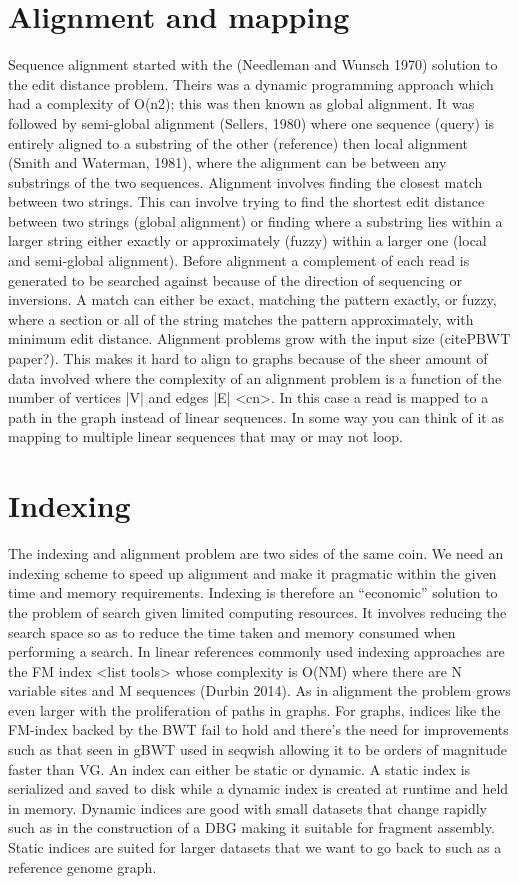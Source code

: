 \documentclass[11pt]{article}
\begin{document}
\section{Alignment and mapping}
\label{sec:org6ca859e}
Sequence alignment started with the (Needleman and Wunsch 1970) solution to the edit distance problem. Theirs was a dynamic programming approach which had a complexity of O(n2); this was then known as global alignment. It was followed by semi-global alignment (Sellers, 1980) where one sequence (query) is entirely aligned to a substring of the other (reference) then local alignment (Smith and Waterman, 1981), where the alignment can be between any substrings of the two sequences.
Alignment involves finding the closest match between two strings. This can involve trying to find the shortest edit distance between two strings (global alignment) or finding where a substring lies within a larger string either exactly or approximately (fuzzy) within a larger one (local and semi-global alignment).
Before alignment a complement of each read is generated to be searched against because of the direction of sequencing or inversions. A match can either be exact, matching the pattern exactly, or fuzzy, where a section or all of the string matches the pattern approximately, with minimum edit distance.
Alignment problems grow with the input size (citePBWT paper?). This makes it hard to align to graphs because of the sheer amount of data involved where the complexity of an alignment problem is a function of the number of  vertices |V| and edges |E| <cn>.  In this case a read is mapped to a  path in the graph instead of linear sequences. In some way you can think of it as mapping to multiple linear sequences that may or may not loop.

\section{Indexing}
\label{sec:orga42fb9c}
The indexing and alignment problem are two sides of the same coin. We need an indexing scheme to speed up alignment and make it pragmatic within the given time and memory requirements. Indexing is therefore an “economic” solution to the problem of search given limited computing resources. It involves reducing the search space so as to reduce the time taken and memory consumed when performing a search.
In linear references commonly used indexing approaches are the FM index <list tools> whose complexity is O(NM) where there are N variable sites and M sequences (Durbin 2014).
As in alignment the problem grows even larger with the proliferation of paths in graphs. For graphs, indices like the FM-index backed by the BWT fail to hold and there’s the need for improvements such as that seen in gBWT used in seqwish allowing it to be orders of magnitude faster than VG.
An index can either be static or dynamic. A static index is serialized and saved to disk while a dynamic index is created at runtime and held in memory. Dynamic indices are good with small datasets that change rapidly such as in the construction of a DBG making it suitable for fragment assembly. Static indices are suited for larger datasets that we want to go back to such as a reference genome graph.
\end{document}
